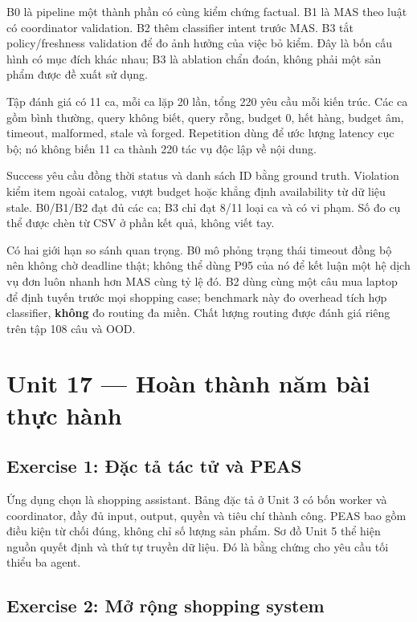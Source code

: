 B0 là pipeline một thành phần có cùng kiểm chứng factual. B1 là MAS theo
luật có coordinator validation. B2 thêm classifier intent trước MAS. B3
tắt policy/freshness validation để đo ảnh hưởng của việc bỏ kiểm. Đây là
bốn cấu hình có mục đích khác nhau; B3 là ablation chẩn đoán, không phải
một sản phẩm được đề xuất sử dụng.

Tập đánh giá có 11 ca, mỗi ca lặp 20 lần, tổng 220 yêu cầu mỗi kiến
trúc. Các ca gồm bình thường, query không biết, query rỗng, budget 0,
hết hàng, budget âm, timeout, malformed, stale và forged. Repetition
dùng để ước lượng latency cục bộ; nó không biến 11 ca thành 220 tác vụ
độc lập về nội dung.

Success yêu cầu đồng thời status và danh sách ID bằng ground truth.
Violation kiểm item ngoài catalog, vượt budget hoặc khẳng định
availability từ dữ liệu stale. B0/B1/B2 đạt đủ các ca; B3 chỉ đạt 8/11
loại ca và có vi phạm. Số đo cụ thể được chèn từ CSV ở phần kết quả,
không viết tay.

Có hai giới hạn so sánh quan trọng. B0 mô phỏng trạng thái timeout đồng
bộ nên không chờ deadline thật; không thể dùng P95 của nó để kết luận
một hệ dịch vụ đơn luôn nhanh hơn MAS cùng tỷ lệ đó. B2 dùng cùng một
câu mua laptop để định tuyến trước mọi shopping case; benchmark này đo
overhead tích hợp classifier, \textbf{không} đo routing đa miền. Chất
lượng routing được đánh giá riêng trên tập 108 câu và OOD.

\section{Unit 17 --- Hoàn thành năm bài thực
hành}\label{unit-17-houxe0n-thuxe0nh-nux103m-buxe0i-thux1ef1c-huxe0nh}

\subsection{Exercise 1: Đặc tả tác tử và
PEAS}\label{exercise-1-ux111ux1eb7c-tux1ea3-tuxe1c-tux1eed-vuxe0-peas}

Ứng dụng chọn là shopping assistant. Bảng đặc tả ở Unit 3 có bốn worker
và coordinator, đầy đủ input, output, quyền và tiêu chí thành công. PEAS
bao gồm điều kiện từ chối đúng, không chỉ số lượng sản phẩm. Sơ đồ Unit
5 thể hiện nguồn quyết định và thứ tự truyền dữ liệu. Đó là bằng chứng
cho yêu cầu tối thiểu ba agent.

\subsection{Exercise 2: Mở rộng shopping
system}\label{exercise-2-mux1edf-rux1ed9ng-shopping-system}

